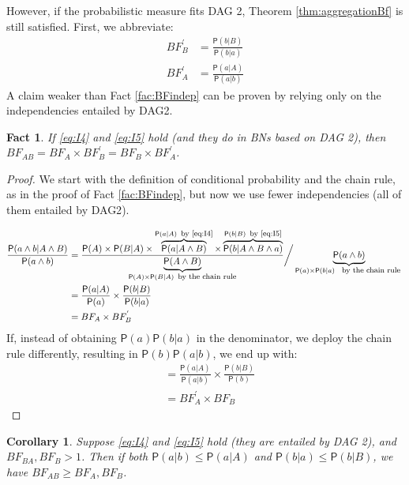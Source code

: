 \documentclass[
  10pt,
  dvipsnames,enabledeprecatedfontcommands]{scrartcl}
\newtheorem{fact}{Fact}
\newcommand{\et}{\wedge}
\newcommand{\pr}[1]{\ensuremath{\mathsf{P}(#1)}}
\newtheorem{corollary}{Corollary}[fact]
\begin{document}
However, if the probabilistic measure fits \textsf{DAG 2}, Theorem
\ref{thm:aggregationBf} is still satisfied. First, we abbreviate:
\begin{align*}
BF^{'}_{B} & = \frac{\pr{b \vert B}}{\pr{b\vert a}} \\
BF^{'}_{A} & = \frac{\pr{a \vert A}}{\pr{a \vert b}}
\end{align*} \noindent A claim weaker than Fact \ref{fac:BFindep} can be
proven by relying only on the independencies entailed by \textsf{DAG2}.

\begin{fact} If \eqref{eq:I4} and \eqref{eq:I5}  hold (and they do in BNs based on \textsf{DAG 2}), then $BF_{AB} =  BF_{A}\times BF^{'}_{B}  = BF_{B} \times BF^{'}_{A}$. \label{fac:BFdep}
\end{fact}

\begin{proof}

We start with the definition of conditional probability and the chain rule, as in the proof of Fact \ref{fac:BFindep}, but now we use fewer independencies (all of them entailed by \textsf{DAG2}). 

 \begin{align*}
\frac{\pr{a \wedge b\vert A\wedge B}}{\pr{a \wedge b}} &
= \frac{\pr{A} \times \pr {B \vert A}  \times
\overbrace{\pr{a \vert A \et B}}^{\pr{a \vert A} \mbox{\footnotesize \, by \eqref{eq:I4}}}
\times \overbrace{\pr{b \vert A \et B \et a}}^{\pr{b \vert B} \mbox{\footnotesize \, by \eqref{eq:I5}}}
}{\underbrace{\pr{A \et B}}_{\pr{A} \times \pr{B\vert A} \mbox{\footnotesize \, by the chain rule}}} \bigg/ \underbrace{\pr{a \wedge b}}_{\pr{a}\times \pr{b\vert a} \mbox{ \footnotesize \, by the chain rule }}\\
& = \frac{\pr{a \vert A}}{\pr{a}} \times \frac{\pr{b\vert B}}{\pr{b \vert a}}\\
& = BF_{A} \times BF^{'}_{B}
\end{align*}
If, instead of obtaining $\pr{a}\pr{b \vert a}$ in the denominator, we deploy the chain rule differently, resulting in $\pr{b}\pr{a \vert b}$, we end up with:
\begin{align*}
& = \frac{\pr{a \vert A}}{\pr{a \vert b}} \times \frac{\pr{b\vert B}}{\pr{b}}\\
& = BF^{'}_{A} \times BF_{B}
\end{align*}

\end{proof}

\begin{corollary} Suppose \eqref{eq:I4} and \eqref{eq:I5}  hold (they are entailed by \textsf{DAG 2}), and $BF_{BA}, BF_{B} >1$. Then if both $\pr{a\vert b} \leq \pr{a \vert A}$ and  $\pr{b \vert a} \leq \pr{b\vert B}$, we have $BF_{AB}\geq BF_{A}, BF_{B}$. \label{cor:BFweaker2}
\end{corollary}
\end{document}
